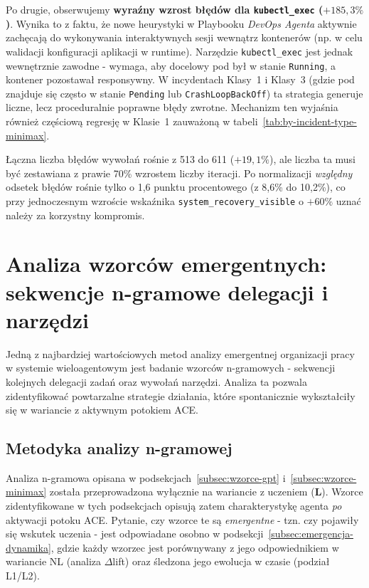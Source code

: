 Po drugie, obserwujemy \textbf{wyraźny wzrost błędów dla \texttt{kubectl\_exec} ($+185,3\%$)}. Wynika to z faktu, że nowe heurystyki w Playbooku \textit{DevOps Agenta} aktywnie zachęcają do wykonywania interaktywnych sesji wewnątrz kontenerów (np. w celu walidacji konfiguracji aplikacji w runtime). Narzędzie \texttt{kubectl\_exec} jest jednak wewnętrznie zawodne - wymaga, aby docelowy pod był w stanie \texttt{Running}, a kontener pozostawał responsywny. W incydentach Klasy~1 i Klasy~3 (gdzie pod znajduje się często w stanie \texttt{Pending} lub \texttt{CrashLoopBackOff}) ta strategia generuje liczne, lecz proceduralnie poprawne błędy zwrotne. Mechanizm ten wyjaśnia również częściową regresję w Klasie~1 zauważoną w tabeli~\ref{tab:by-incident-type-minimax}.

Łączna liczba błędów wywołań rośnie z 513 do 611 ($+19,1\%$), ale liczba ta musi być zestawiana z prawie 70\% wzrostem liczby iteracji. Po normalizacji \emph{względny} odsetek błędów rośnie tylko o 1,6 punktu procentowego (z 8,6\% do 10,2\%), co przy jednoczesnym wzroście wskaźnika \texttt{system\_recovery\_visible} o $+60\%$ uznać należy za korzystny kompromis.

\section{Analiza wzorców emergentnych: sekwencje n-gramowe delegacji i narzędzi}

Jedną z najbardziej wartościowych metod analizy emergentnej organizacji pracy w systemie wieloagentowym jest badanie wzorców n-gramowych - sekwencji kolejnych delegacji zadań oraz wywołań narzędzi. Analiza ta pozwala zidentyfikować powtarzalne strategie działania, które spontanicznie wykształciły się w wariancie z aktywnym potokiem ACE.

\subsection{Metodyka analizy n-gramowej}

Analiza n-gramowa opisana w podsekcjach~\ref{subsec:wzorce-gpt} i~\ref{subsec:wzorce-minimax} została przeprowadzona wyłącznie na wariancie z uczeniem (\textbf{L}). Wzorce zidentyfikowane w tych podsekcjach opisują zatem charakterystykę agenta \emph{po} aktywacji potoku ACE. Pytanie, czy wzorce te są \emph{emergentne} - tzn. czy pojawiły się wskutek uczenia - jest odpowiadane osobno w podsekcji~\ref{subsec:emergencja-dynamika}, gdzie każdy wzorzec jest porównywany z jego odpowiednikiem w wariancie NL (analiza $\Delta$lift) oraz śledzona jego ewolucja w czasie (podział L1/L2).

